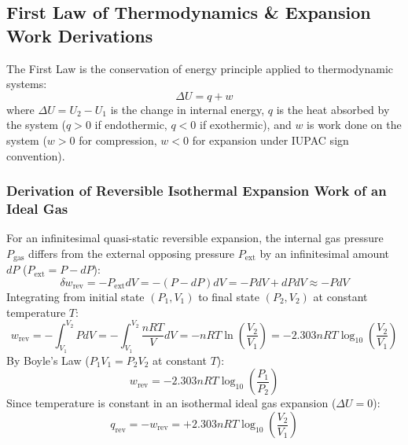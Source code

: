 \documentclass[10pt,a4paper]{article}
\begin{document}
\subsection{First Law of Thermodynamics \& Expansion Work Derivations}
The First Law is the conservation of energy principle applied to thermodynamic systems:
\begin{equation}
  \Delta U = q + w
\end{equation}
where $\Delta U = U_2 - U_1$ is the change in internal energy, $q$ is the heat absorbed by the system ($q > 0$ if endothermic, $q < 0$ if exothermic), and $w$ is work done on the system ($w > 0$ for compression, $w < 0$ for expansion under IUPAC sign convention).

\subsubsection{Derivation of Reversible Isothermal Expansion Work of an Ideal Gas}
For an infinitesimal quasi-static reversible expansion, the internal gas pressure $P_{\text{gas}}$ differs from the external opposing pressure $P_{\text{ext}}$ by an infinitesimal amount $dP$ ($P_{\text{ext}} = P - dP$):
\begin{equation}
  \delta w_{\text{rev}} = -P_{\text{ext}} dV = -(P - dP) dV = -P dV + dP dV \approx -P dV
\end{equation}
Integrating from initial state $(P_1, V_1)$ to final state $(P_2, V_2)$ at constant temperature $T$:
\begin{equation}
  w_{\text{rev}} = -\int_{V_1}^{V_2} P dV = -\int_{V_1}^{V_2} \frac{n R T}{V} dV = -n R T \ln\left(\frac{V_2}{V_1}\right) = -2.303 n R T \log_{10}\left(\frac{V_2}{V_1}\right)
\end{equation}
By Boyle's Law ($P_1 V_1 = P_2 V_2$ at constant $T$):
\begin{equation}
  w_{\text{rev}} = -2.303 n R T \log_{10}\left(\frac{P_1}{P_2}\right)
\end{equation}
Since temperature is constant in an isothermal ideal gas expansion ($\Delta U = 0$):
\begin{equation}
  q_{\text{rev}} = -w_{\text{rev}} = +2.303 n R T \log_{10}\left(\frac{V_2}{V_1}\right)
\end{equation}
\end{document}
